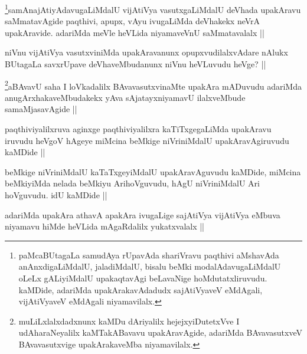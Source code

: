 \begin{artha}
\footnote{paMcaBUtagaLa samudAya rUpavAda shariVravu paqthivi aMshavAda anAnxdigaLiMdalU, jaladiMdalU, bisalu beMki modalAdavugaLiMdalU oLeLx gALiyiMdalU upakaqtavAgi beLavaNige hoMdutatxliruvudu. kaMDide, adariMda upakArakavAdadudx sajAtiVyaveV eMdAgali, vijAtiVyaveV eMdAgali niyamavilalx.}samAnajAtiyAdavugaLiMdalU vijAtiVya vasutxgaLiMdalU deVhada upakAravu saMmatavAgide paqthivi, apupx, vAyu ivugaLiMda deVhakekx neVrA upakAravide. adariMda meVle heVLida niyamaveVnU saMmatavalalx ||
\end{artha}

\begin{artha}
niVnu vijAtiVya vasutxviniMda upakAravanunx opupxvudilalxvAdare nAlukx BUtagaLa savxrUpave deVhaveMbudanunx niVnu heVLuvudu heVge? ||
\end{artha}

\begin{artha}
\footnote{muLiLxlalxdadxnunx kaMDu dAriyalilx hejejxyiDutetxVve I udAharaNeyalilx kaMTakABavavu upakAravAgide, adariMda BAvavasutxveV BAvavasutxvige upakArakaveMba niyamavilalx.}aBAvavU saha I loVkadalilx BAvavasutxvinaMte upakAra mADuvudu adariMda anugArxhakaveMbudakekx yAva sAjatayxniyamavU ilalxveMbude samaMjasavAgide ||
\end{artha}

\begin{artha}
paqthiviyalilxruva aginxge paqthiviyalilxra kaTiTxgegaLiMda upakAravu iruvudu heVgoV hAgeye miMcina beMkige niVriniMdalU upakAravAgiruvudu kaMDide ||
\end{artha}

\begin{artha}
beMkige niVriniMdalU kaTaTxgeyiMdalU upakAravAguvudu kaMDide, miMcina beMkiyiMda nelada beMkiyu ArihoVguvudu, hAgU niVriniMdalU Ari hoVguvudu. idU kaMDide ||
\end{artha}

\begin{artha}
adariMda upakAra athavA apakAra ivugaLige sajAtiVya vijAtiVya eMbuva niyamavu hiMde heVLida mAgaRdalilx yukatxvalalx ||
\end{artha}

